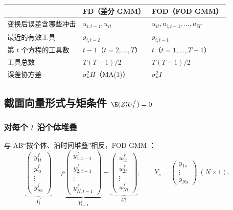 \begin{center}
\small
\begin{tabular}{lll}
\toprule
 & FD（差分 GMM） & FOD（FOD GMM）\\
\midrule
变换后误差含哪些冲击 & $u_{i,t-1},u_{it}$ & $u_{it},u_{i,t+1},\dots,u_{iT}$\\
最近的有效工具 & $y_{i,t-2}$ & $y_{i,t-1}$\\
第 $t$ 个方程的工具数 & $t-1$（$t=2,\dots,T$） & $t$（$t=1,\dots,T-1$）\\
工具总数 & $T(T-1)/2$ & $T(T-1)/2$\\
误差协方差 & $\sigma_u^2H$（MA(1)） & $\sigma_u^2I$\\
\bottomrule
\end{tabular}
\end{center}

\subsection{截面向量形式与矩条件 \texorpdfstring{$\E(Z_t'U_t^f)=0$}{E(Z'U)=0}}

\subsubsection{对每个 \texorpdfstring{$t$}{t} 沿个体堆叠}

与 AB“按个体、沿时间堆叠”相反，FOD GMM ：
\[
\underbrace{\begin{pmatrix}y_{1t}^f\\ y_{2t}^f\\ \vdots\\ y_{Nt}^f\end{pmatrix}}_{Y_t^f}
=\rho\underbrace{\begin{pmatrix}y_{1,t-1}^f\\ y_{2,t-1}^f\\ \vdots\\ y_{N,t-1}^f\end{pmatrix}}_{Y_{t-1}^f}
+\underbrace{\begin{pmatrix}u_{1t}^f\\ u_{2t}^f\\ \vdots\\ u_{Nt}^f\end{pmatrix}}_{U_t^f},\qquad
Y_s=\begin{pmatrix}y_{1s}\\ \vdots\\ y_{Ns}\end{pmatrix}\ (N\times1).
\]

